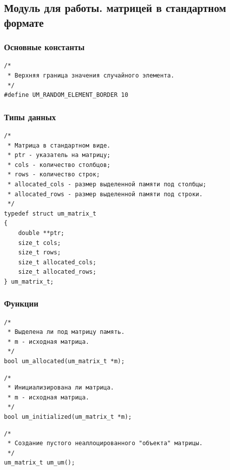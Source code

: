 \documentclass[a4paper,12pt]{extarticle}
\begin{document}
\subsection{Модуль для работы. матрицей в стандартном формате}
\subsubsection{Основные константы}
\begin{verbatim}
/*
 * Верхняя граница значения случайного элемента.
 */
#define UM_RANDOM_ELEMENT_BORDER 10
\end{verbatim}




\subsubsection{Типы данных}
\begin{verbatim}
/*
 * Матрица в стандартном виде.
 * ptr - указатель на матрицу;
 * cols - количество столбцов;
 * rows - количество строк;
 * allocated_cols - размер выделенной памяти под столбцы;
 * allocated_rows - размер выделенной памяти под строки.
 */
typedef struct um_matrix_t
{
    double **ptr;
    size_t cols;
    size_t rows;
    size_t allocated_cols;
    size_t allocated_rows;
} um_matrix_t;
\end{verbatim}




\subsubsection{Функции}
\begin{verbatim}
/*
 * Выделена ли под матрицу память.
 * m - исходная матрица.
 */
bool um_allocated(um_matrix_t *m);
\end{verbatim}


 \vspace{0.5cm}

\begin{verbatim}
/*
 * Инициализирована ли матрица.
 * m - исходная матрица.
 */
bool um_initialized(um_matrix_t *m);
\end{verbatim}


 \vspace{0.5cm}

\begin{verbatim}
/*
 * Создание пустого неаллоцированного "объекта" матрицы.
 */
um_matrix_t um_um();
\end{verbatim}
\end{document}

